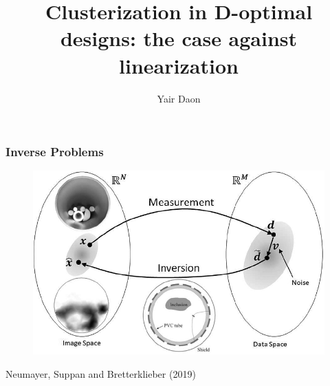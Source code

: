 \documentclass{beamer}
\title{Clusterization in D-optimal designs: the case against linearization}
\author{Yair Daon}
\institute{Azrieli Faculty of Medicine, Bar-Ilan University}
\date{}
\begin{document}

\begin{frame}
  \titlepage
\end{frame}


\begin{frame}
  \frametitle{Inverse Problems}

  \begin{figure}
    \centering
    \includegraphics[width=\textwidth]{figs/inverse_problem.png}
  \end{figure}

  \footnotesize{Neumayer, Suppan and Bretterklieber (2019)}
\end{frame}
\end{document}
